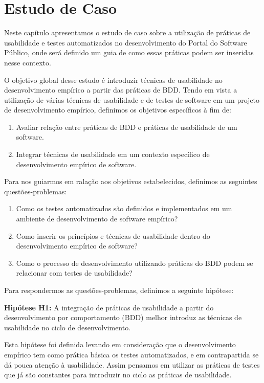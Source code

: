 \chapter{Estudo de Caso}

Neste capítulo apresentamos o estudo de caso sobre a utilização de práticas de usabilidade e testes automatizados no desenvolvimento do Portal do Software Público, onde será definido um guia de como essas práticas podem ser inseridas nesse contexto.

O objetivo global desse estudo é introduzir técnicas de usabilidade no desenvolvimento empírico a partir das práticas de BDD.
%
Tendo em vista a utilização de várias técnicas de usabilidade e de testes de software em um projeto de desenvolvimento empírico, definimos os objetivos específicos à fim de:

\begin{enumerate}
\item Avaliar relação entre práticas de BDD e práticas de usabilidade de um software. 

\item Integrar técnicas de usabilidade em um contexto específico de desenvolvimento empírico de software.
\end{enumerate}

Para nos guiarmos  em ralação aos objetivos estabelecidos, definimos as seguintes questões-problemas:

\begin{enumerate}
\item Como os testes automatizados são definidos e implementados em um ambiente de desenvolvimento de software empírico?
\item Como inserir os princípios e técnicas de usabilidade dentro do desenvolvimento empírico de software?
\item Como o processo de desenvolvimento utilizando práticas do BDD podem se relacionar com testes de usabilidade?
\end{enumerate}

Para respondermos as questões-problemas, definimos a seguinte hipótese:

\textbf{Hipótese H1: } A integração de práticas de usabilidade a partir do desenvolvimento por comportamento (BDD) melhor introduz as técnicas de usabilidade no ciclo de desenvolvimento.
	
Esta hipótese foi definida levando em consideração que o desenvolvimento empírico tem como prática básica os testes automatizados, e em contrapartida se dá pouca atenção à usabilidade. Assim pensamos em utilizar as práticas de testes que já são constantes para introduzir no ciclo as práticas de usabilidade.

